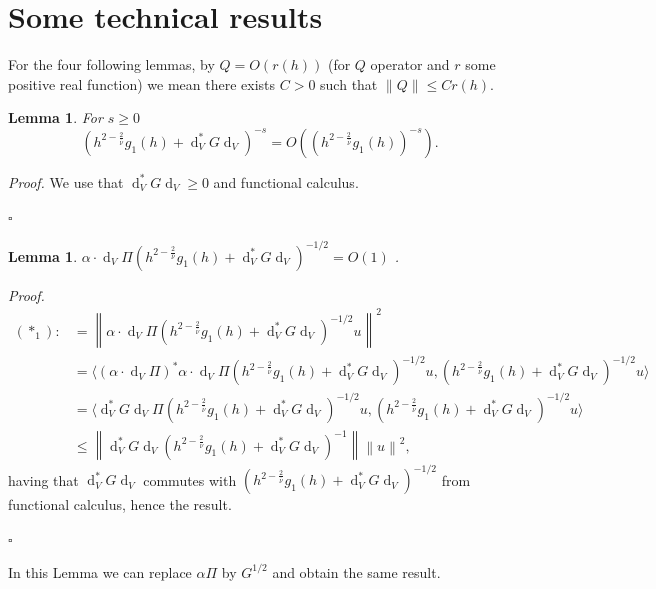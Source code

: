 \documentclass[12pt]{amsart}
\def\<{\langle}
\def\>{\rangle}
\newcommand{\bp}{{\it Proof. }}
\newcommand{\ep}{\hfill $\square$}
\renewcommand{\d}{\operatorname{d}}
\numberwithin{equation}{section}
\numberwithin{figure}{section}
\newcommand{\vvert}[1]{\left\lVert#1\right\rVert}
\newtheorem{lemma}[defin]{Lemma}
\begin{document}
\section{Some technical results}

For the four following lemmas, by $Q = O(r(h))$ (for $Q$ operator and $r$ some positive real function) we mean there exists $C>0$ such that $\vvert{Q} \leq Cr(h)$.

\begin{lemma}\label{lem:1}
For $s\geq0$
\begin{equation*}
(h^{2-\frac2{\overline{\nu}}}g_1(h) + \d_V^*G\d_V)^{-s} = O((h^{2-\frac2{\overline{\nu}}}g_1(h))^{-s}).
\end{equation*}
\end{lemma}
\bp We use that $\d_V^*G\d_V\geq0$ and functional calculus.

\ep

\begin{lemma}\label{lem:2}
    $\alpha\cdot \d_V\Pi(h^{2-\frac2{\overline{\nu}}}g_1(h) + \d_V^*G\d_V)^{-1/2} = O(1)$%
.
\end{lemma}
\bp
\begin{equation*}
\begin{split}
    (\ast_1) :&= \vvert{\alpha\cdot \d_V\Pi(h^{2-\frac2{\overline{\nu}}}g_1(h) + \d_V^*G\d_V)^{-1/2}u}^2\\
    &= \<(\alpha\cdot \d_V\Pi)^*\alpha\cdot \d_V\Pi(h^{2-\frac2{\overline{\nu}}}g_1(h) + \d_V^*G\d_V)^{-1/2}u,(h^{2-\frac2{\overline{\nu}}}g_1(h) + \d_V^*G\d_V)^{-1/2}u\>\\
    &= \<\d_V^*G\d_V\Pi(h^{2-\frac2{\overline{\nu}}}g_1(h) + \d_V^*G\d_V)^{-1/2}u,(h^{2-\frac2{\overline{\nu}}}g_1(h) + \d_V^*G\d_V)^{-1/2}u\>\\
    &\leq \vvert{\d_V^*G\d_V(h^{2-\frac2{\overline{\nu}}}g_1(h) + \d_V^*G\d_V)^{-1}}\vvert{u}^2,
\end{split}
\end{equation*}
having %
that $\d_V^*G\d_V$ commutes with $(h^{2-\frac2{\overline{\nu}}}g_1(h) + \d_V^*G\d_V)^{-1/2}$ from functional calculus, hence the result.

\ep

In this Lemma we can replace $\alpha\Pi$ by $G^{1/2}$ and obtain the same result.
\end{document}
